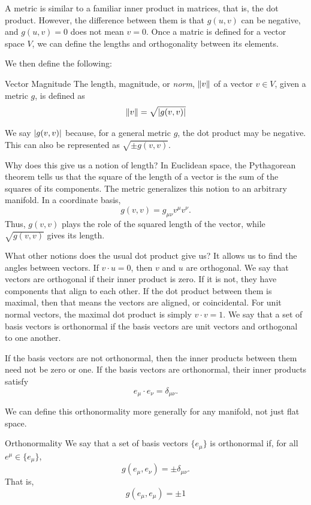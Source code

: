 	A metric is similar to a familiar inner product in matrices, that is, the dot product.
	However, the difference between them is that $g(u,v)$ can be negative, and $g(u,v)=0$
	does not mean $v=0$. Once a matric is defined for a vector space $V$, we can define the 
	lengths and orthogonality between its elements. 

	We then define the following:
	\begin{definition}{Vector Magnitude}
		The length, magnitude, or \textit{norm}, $\norm{v}$ of a vector $v\in V$, given a metric
		$g$, is defined as
		\begin{equation}
			\label{eq:magnitude}
			\norm{v} = \sqrt{\abs{g(v,v)}}
		\end{equation}
	\end{definition}
	We say $\abs{g(v,v)}$ because, for a general metric $g$, the dot product 
	may be negative. This can also be represented as $\sqrt{\pm g(v,v)}$.

	Why does this give us a notion of length? In Euclidean space, the
	Pythagorean theorem tells us that the square of the length of a vector
	is the sum of the squares of its components. The metric generalizes
	this notion to an arbitrary manifold. In a coordinate basis,
	\[
		g(v,v)
		=
		g_{\mu\nu}v^\mu v^\nu.
	\]
	Thus, $g(v,v)$ plays the role of the squared length of the vector,
	while $\sqrt{g(v,v)}$ gives its length.

	What other notions does the usual dot product give us? It allows us to find
	the angles between vectors. If $v\cdot u=0$, then $v$ and $u$ are orthogonal.
	We say that vectors are orthogonal if their inner product is zero. If it 
	is not, they have components that align to each other. If the dot product 
	between them is maximal, then that means the vectors are aligned, or coincidental.
	For unit normal vectors, the maximal dot product is simply $v\cdot v = 1$.
	We say that a set of basis vectors is orthonormal if the basis vectors
	are unit vectors and orthogonal to one another.

	If the basis vectors are not orthonormal, then the inner products
	between them need not be zero or one. If the basis vectors are
	orthonormal, their inner products satisfy
	\[
		e_\mu\cdot e_\nu = \delta_{\mu\nu}.
	\]

	We can define this orthonormality more generally for any 
	manifold, not just flat space.

	\begin{definition}{Orthonormality}
		We say that a set of basis vectors
		$\{e_\mu\}$ is orthonormal if, for all $e^\mu \in\{e_\mu\}$, 
		\begin{equation}
			\label{eq:orthonormality}
			g(e_\mu,e_\nu)=\pm \delta_{\mu\nu}.
		\end{equation}
		That is,
		\[
			g(e_\mu,e_\mu) = \pm 1
		\]
	\end{definition}
	
